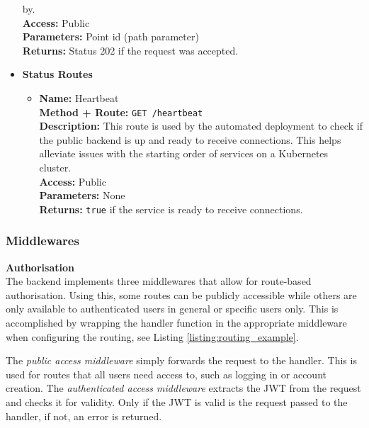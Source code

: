 \begin{itemize}
{\begin{itemize}
{        by.\\
        \textbf{Access:} Public\\
        \textbf{Parameters:} Point id (path parameter)\\
        \textbf{Returns:} Status 202 if the request was accepted.\\
      }
    \end{itemize}
  }
  \item{
    \textbf{Status Routes}
    \begin{itemize}
      \item {
        \textbf{Name:} Heartbeat\\
        \textbf{Method + Route:} \texttt{GET /heartbeat}\\
        \textbf{Description:} This route is used by the automated deployment to
        check if the public backend is up and ready to receive connections. This
        helps alleviate issues with the starting order of services on a
        Kubernetes cluster.\\
        \textbf{Access:} Public\\
        \textbf{Parameters:} None\\
        \textbf{Returns:} \texttt{true} if the service is ready to receive connections.\\
      }
    \end{itemize}
  }
\end{itemize}

\subsubsection{Middlewares}\label{backend_middlewares}
\label{middleware_route_authorisation}\textbf{Authorisation}\\
The backend implements three middlewares that allow for route-based
authorisation. Using this, some routes can be publicly accessible while others
are only available to authenticated users in general or specific users only.
This is accomplished by wrapping the handler function in the appropriate
middleware when configuring the routing, see Listing
\ref{listing:routing_example}.

The \textit{public access middleware} simply forwards the request to the
handler. This is used for routes that all users need access to, such as logging
in or account creation. The \textit{authenticated access middleware} extracts
the JWT from the request and checks it for validity. Only if the JWT is valid is
the request passed to the handler, if not, an error is returned.

